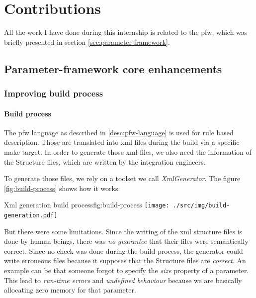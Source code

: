 \chapter{Contributions}\label{chap:contributions}

\begin{sectionIntro}
    All the work I have done during this internship is related
    to the \gls{pfw}, which was briefly presented in section \ref{sec:parameter-framework}.
\end{sectionIntro}

\section{Parameter-framework core enhancements}

\subsection{Improving build process}
\subsubsection{Build process}
The pfw language as described in \ref{desc:pfw-language} is used for rule based
description. Those are translated into \gls{xml} files during the build via a
specific make target.  In order to generate those \gls{xml} files, we also need
the information of the Structure files, which are written by the integration
engineers.

To generate those files, we rely on a toolset we call \emph{XmlGenerator}.
The figure \ref{fig:build-process} shows how it works:

\begin{figureGraphics}{Xml generation build process}{fig:build-process}
    \texttt{[image: ./src/img/build-generation.pdf]}
\end{figureGraphics}

But there were some limitations. Since the writing of the \gls{xml} structure files is done by human beings, there was
\emph{no guarantee} that their files were semantically correct.
Since no check was done during the build-process, the generator could write erroneous files because it supposes that
the Structure files are \emph{correct}. An example can be that someone forgot to specify the \emph{size} property of a parameter.
This lead to \emph{run-time errors} and \emph{undefined behaviour} because we are basically allocating zero memory for that parameter.

